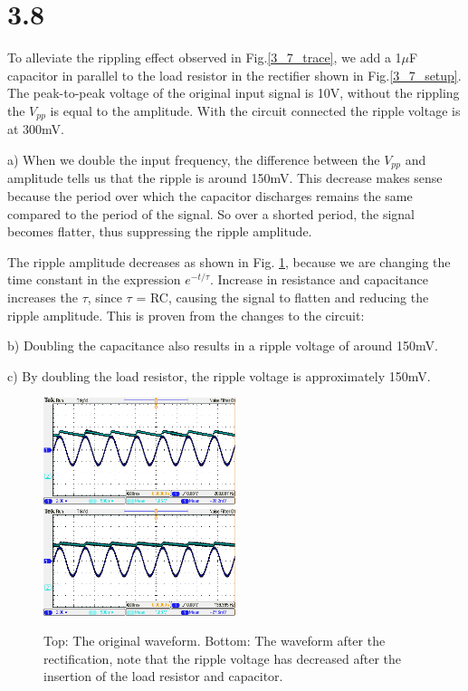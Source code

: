 \documentclass[authoryear, 12pt,5p, times]{elsarticle}
\begin{document}
\section*{3.8}
To alleviate the rippling effect observed in Fig.\ref{3_7_trace}, we add a 1$\mu$F capacitor in parallel to the load resistor in the rectifier shown in Fig.\ref{3_7_setup}. The peak-to-peak voltage of the original input signal  is 10V, without the rippling the $V_{pp}$ is equal to the amplitude. With the circuit connected the ripple voltage is at 300mV.
\par a) When we double the input frequency, %
the difference between the $V_{pp}$ and amplitude tells us that the ripple is around 150mV.  This decrease makes sense because the period over which the capacitor discharges remains the same compared to the period of the signal. So over a shorted period, the signal becomes flatter, thus suppressing the ripple amplitude. 
\par  The ripple amplitude decreases as shown in Fig. \ref{ripple}, because we are changing the time constant in the expression $e^{-t/\tau}$. Increase in resistance and capacitance increases the $\tau$, since $\tau$ = RC, causing the signal to flatten and reducing the ripple amplitude. This is proven from the changes to the circuit: 
\par  b) Doubling the capacitance also results in a ripple voltage of around 150mV.
\par c) By doubling the load resistor, the ripple voltage is approximately 150mV.
\begin{figure}[h!]
\center
\includegraphics[width=0.5\textwidth]{figure/TEK00015}
\includegraphics[width=0.5\textwidth]{figure/TEK00017}
\caption{Top: The original waveform. Bottom: The waveform after the rectification, note that the ripple voltage has decreased after the insertion of the load resistor and capacitor.}
\label{ripple}
\end{figure}
\end{document}
